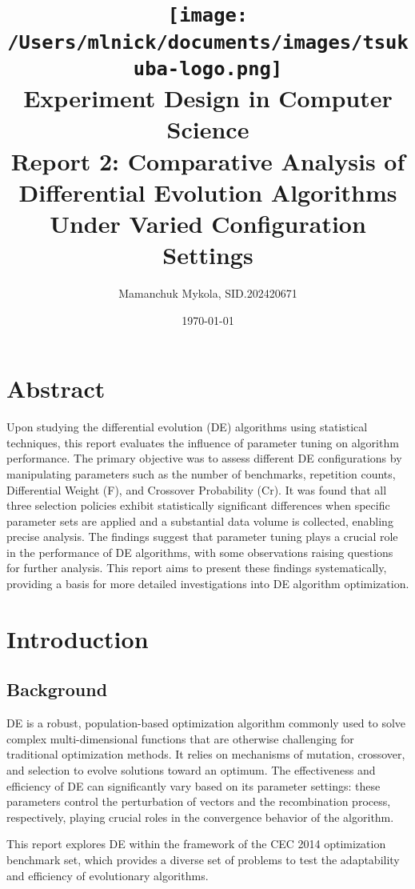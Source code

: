 \documentclass[12pt,a4paper]{article}
\title{
    \texttt{[image: /Users/mlnick/documents/images/tsukuba-logo.png]} \\
    \vspace{2mm}
    \textbf{Experiment Design in Computer Science} \\
    \vspace{3mm}    
    Report 2: Comparative Analysis of   \\
    Differential Evolution Algorithms   \\
    Under Varied Configuration Settings
}
\author{Mamanchuk Mykola, SID.202420671}
\date{\today}
\begin{document}
\maketitle


\section{Abstract}
Upon studying the differential evolution (DE) algorithms using statistical techniques, this report evaluates the influence of parameter tuning on algorithm performance. The primary objective was to assess different DE configurations by manipulating parameters such as the number of benchmarks, repetition counts, Differential Weight (F), and Crossover Probability (Cr). It was found that all three selection policies exhibit statistically significant differences when specific parameter sets are applied and a substantial data volume is collected, enabling precise analysis. The findings suggest that parameter tuning plays a crucial role in the performance of DE algorithms, with some observations raising questions for further analysis. This report aims to present these findings systematically, providing a basis for more detailed investigations into DE algorithm optimization.

\section{Introduction}
\subsection{Background}
DE is a robust, population-based optimization algorithm commonly used to solve complex multi-dimensional functions that are otherwise challenging for traditional optimization methods. It relies on mechanisms of mutation, crossover, and selection to evolve solutions toward an optimum. The effectiveness and efficiency of DE can significantly vary based on its parameter settings: these parameters control the perturbation of vectors and the recombination process, respectively, playing crucial roles in the convergence behavior of the algorithm.

This report explores DE within the framework of the CEC 2014 optimization benchmark set, which provides a diverse set of problems to test the adaptability and efficiency of evolutionary algorithms.
\end{document}
